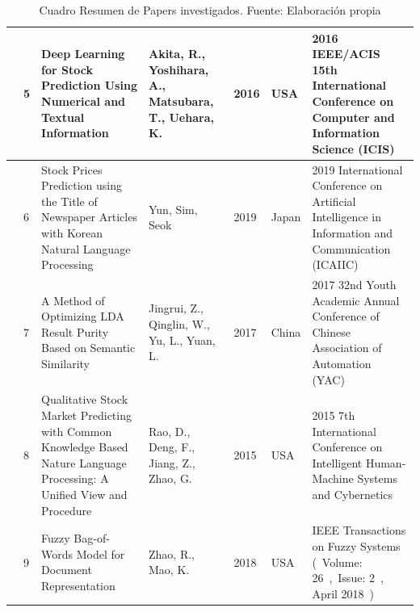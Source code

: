 \begin{table}[h]
\begin{tabular}{|m{0.5cm}|m{0.3cm}|m{4cm}|m{2cm}|m{0.6cm}|m{1.7cm}|m{3cm}|}
		\cline{2-7}
		& 5                                             & Deep Learning for Stock Prediction Using Numerical and Textual
		Information                                               & Akita, R., Yoshihara, A., Matsubara, T.,  Uehara, K. & 2016                                        & USA                                          & 2016 IEEE/ACIS 15th International Conference on Computer and
		Information Science (ICIS)             \\ 
		\hline
		\multirow{4}{*}[-28ex]{\rotcell{\rlap{Técnica}}}                                          & 6                                             & Stock Prices Prediction using the Title of Newspaper Articles
		with Korean Natural Language Processing~                   & Yun, Sim,  Seok                                      & 2019                                        & Japan                                        & 2019 International Conference on Artificial Intelligence in
		Information and Communication (ICAIIC)  \\ 
		\cline{2-7}
		& 7                                             & A Method of Optimizing LDA Result Purity Based on Semantic
		Similarity                                                    & Jingrui, Z., Qinglin, W., Yu, L.,  Yuan, L.          & 2017                                        & China                                        & 2017 32nd Youth Academic Annual Conference of Chinese
		Association of Automation (YAC)~              \\ 
		\cline{2-7}
		& 8                                             & Qualitative Stock Market Predicting with Common Knowledge Based
		Nature Language Processing: A Unified View and Procedure & Rao, D., Deng, F., Jiang, Z.,  Zhao, G.~             & 2015                                        & USA                                          & 2015 7th International Conference on Intelligent Human-Machine
		Systems and Cybernetics              \\ 
		\cline{2-7}
		& 9                                             & Fuzzy Bag-of-Words Model for Document Representation                                                                       & Zhao, R.,  Mao, K.                                   & 2018                                        & USA                                          & IEEE Transactions on Fuzzy Systems (~Volume:
		26~,~Issue: 2~, April 2018~)                           \\
		\hline
	\end{tabular}
	\caption{Cuadro Resumen de Papers investigados. Fuente: Elaboración propia}
\label{A:table}
\end{table}




